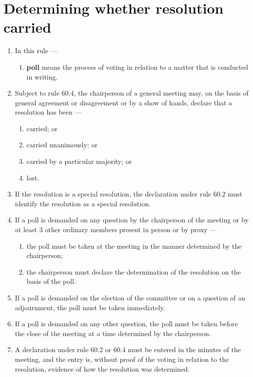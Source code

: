 \hypertarget{determining-whether-resolution-carried}{%
\section{Determining whether resolution carried}\label{determining-whether-resolution-carried}}

\begin{enumerate}

\item In this rule ---

  \begin{enumerate}
  
  \item \textbf{poll} means the process of voting in relation to a matter that is conducted in writing.
  \end{enumerate}
\item Subject to rule 60.4, the chairperson of a general meeting may, on the basis of general agreement or disagreement or by a show of hands, declare that a resolution has been ---

  \begin{enumerate}
  
  \item carried; or
  \item carried unanimously; or
  \item carried by a particular majority; or
  \item lost.
  \end{enumerate}
\item If the resolution is a special resolution, the declaration under rule 60.2 must identify the resolution as a special resolution.
\item If a poll is demanded on any question by the chairperson of the meeting or by at least 3 other ordinary members present in person or by proxy ---

  \begin{enumerate}
  
  \item the poll must be taken at the meeting in the manner determined by the chairperson;
  \item the chairperson must declare the determination of the resolution on the basis of the poll.
  \end{enumerate}
\item If a poll is demanded on the election of the committee or on a question of an adjournment, the poll must be taken immediately.
\item If a poll is demanded on any other question, the poll must be taken before the close of the meeting at a time determined by the chairperson.
\item A declaration under rule 60.2 or 60.4 must be entered in the minutes of the meeting, and the entry is, without proof of the voting in relation to the resolution, evidence of how the resolution was determined.
\end{enumerate}

